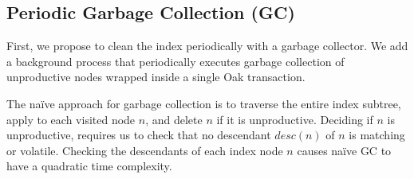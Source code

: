 \documentclass[abstracton,12pt]{scrartcl}
\theoremstyle{definition}
\begin{document}
\vspace{-0.3cm}

\subsection{Periodic Garbage Collection (GC)}

\label{sec:gc}

First, we propose to clean the index periodically with a garbage collector.
We add a background process that periodically executes
garbage collection of unproductive nodes wrapped inside 
a single Oak transaction.

The naïve approach for garbage collection is to traverse the entire index subtree,
apply  to each visited node $n$, and delete $n$ if it
is unproductive. Deciding if $n$ is unproductive, requires us to check that no
descendant $desc(n)$ of $n$ is matching or volatile. Checking the descendants of
each index node $n$ causes naïve GC to have a quadratic time complexity.
\end{document}
